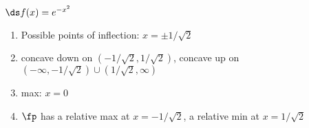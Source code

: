 {$\ds f(x) = e^{-x^2}$\label{exer:03_04_set2_last}
}
{\begin{enumerate}[label=(\alph*)]
\item Possible points of inflection: $x=\pm 1/\sqrt{2}$
\item concave down on $(- 1/\sqrt{2}, 1/\sqrt{2})$,
concave up on $(-\infty,- 1/\sqrt{2})\cup( 1/\sqrt{2},\infty)$
\item max: $x=0$
\item $\fp$ has a relative max at $x=-1/\sqrt{2}$,
a relative min at $x=1/\sqrt{2}$
\end{enumerate}}
